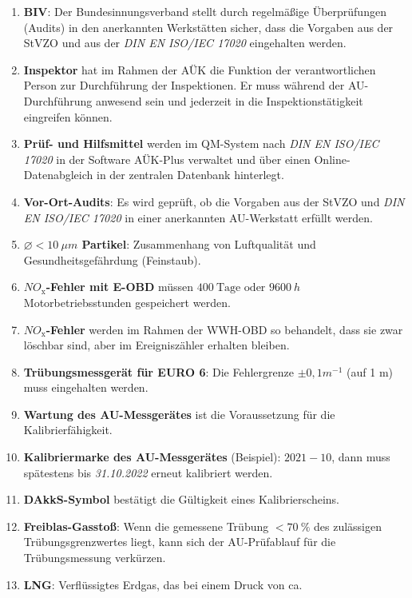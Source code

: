 \documentclass{vorlage-design-main}
\begin{document}
\begin{enumerate}
\def\labelenumi{\arabic{enumi}.}

\item
  \textbf{BIV}: Der Bundesinnungsverband stellt durch regelmäßige
  Überprüfungen (Audits) in den anerkannten Werkstätten sicher, dass die
  Vorgaben aus der StVZO und aus der \emph{DIN EN ISO/IEC 17020}
  eingehalten werden.
\item
  \textbf{Inspektor} hat im Rahmen der AÜK die Funktion der
  verantwortlichen Person zur Durchführung der Inspektionen. Er muss
  während der AU-Durchführung anwesend sein und jederzeit in die
  Inspektionstätigkeit eingreifen können.
\item
  \textbf{Prüf- und Hilfsmittel} werden im QM-System nach \emph{DIN EN
  ISO/IEC 17020} in der Software AÜK-Plus verwaltet und über einen
  Online-Datenabgleich in der zentralen Datenbank hinterlegt.
\item
  \textbf{Vor-Ort-Audits}: Es wird geprüft, ob die Vorgaben aus der
  StVZO und \emph{DIN EN ISO/IEC 17020} in einer anerkannten
  AU-Werkstatt erfüllt werden.
\item
  \textbf{$\boxed{\varnothing < 10~\mu m}$ Partikel}: Zusammenhang von
  Luftqualität und Gesundheitsgefährdung (Feinstaub).
\item
  \textbf{$NO_\text{x}$-Fehler mit E-OBD} müssen
  $\boxed{400~\text{Tage  oder } 9600~h}$ Motorbetriebsstunden
  gespeichert werden.
\item
  \textbf{$NO_\text{x}$-Fehler} werden im Rahmen der WWH-OBD so
  behandelt, dass sie zwar löschbar sind, aber im Ereigniszähler
  erhalten bleiben.
\item
  \textbf{Trübungsmessgerät für EURO 6}: Die Fehlergrenze
  $\boxed{\pm0,1 m^{-1}}$ (auf 1 m) muss eingehalten werden.
\item
  \textbf{Wartung des AU-Messgerätes} ist die Voraussetzung für die
  Kalibrierfähigkeit.
\item
  \textbf{Kalibriermarke des AU-Messgerätes} (Beispiel):
  $\boxed{2021-10}$, dann muss spätestens bis \emph{31.10.2022} erneut
  kalibriert werden.
\item
  \textbf{DAkkS-Symbol} bestätigt die Gültigkeit eines Kalibrierscheins.
\item
  \textbf{Freiblas-Gasstoß}: Wenn die gemessene Trübung
  $\boxed{< 70~\%}$ des zulässigen Trübungsgrenzwertes liegt, kann
  sich der AU-Prüfablauf für die Trübungsmessung verkürzen.
\item
  \textbf{LNG}: Verflüssigtes Erdgas, das bei einem Druck von ca.

\end{enumerate}
\end{document}

